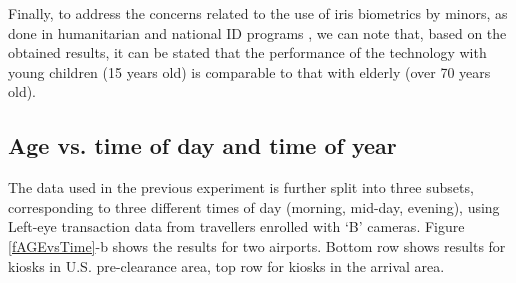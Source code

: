\documentclass{cta-author}%
\begin{document}
Finally, to address the concerns related to the use of iris biometrics by minors, as done in  humanitarian and national ID programs \cite{FBI-IJCB2014},
we can note that,
 based on the obtained results, it can be stated that
the performance of the technology with  young children (15 years old) is comparable to that with elderly (over 70 years old). 






\subsection{Age vs. time of day and time of year}



The data used  in the previous experiment is further split into three subsets, corresponding to three different times of day (morning, mid-day, evening), using Left-eye transaction data from travellers enrolled with  `B' cameras.
Figure \ref{fAGEvsTime}-b shows the results for two airports.  
Bottom row shows results for kiosks in U.S. pre-clearance area, top row for kiosks in the arrival area.




\end{document}
